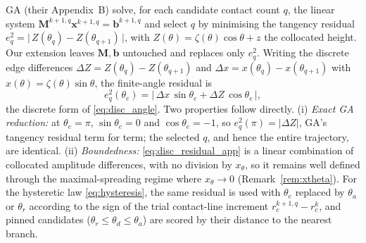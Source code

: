 \documentclass{jfm}
\newcommand{\be}{\begin{equation}}
\newcommand{\ee}{\end{equation}}
\begin{document}
GA (their Appendix~B) solve, for each candidate contact count $q$, the linear system
$\mathbf M^{k+1,q}\mathbf x^{k+1,q}=\mathbf b^{k+1,q}$ and select $q$ by minimising the
tangency residual $e^2_q=\big|\,Z(\theta_q)-Z(\theta_{q+1})\,\big|$, with
$Z(\theta)=\zeta(\theta)\cos\theta+z$ the collocated height. Our extension leaves
$\mathbf M,\mathbf b$ untouched and replaces only $e^2_q$. Writing the discrete edge
differences $\Delta Z=Z(\theta_q)-Z(\theta_{q+1})$ and
$\Delta x=x(\theta_q)-x(\theta_{q+1})$ with $x(\theta)=\zeta(\theta)\sin\theta$, the
finite-angle residual is
\be\label{eq:disc_residual_app}
e^2_q(\theta_e)=\big|\,\Delta x\,\sin\theta_e+\Delta Z\,\cos\theta_e\,\big|,
\ee
the discrete form of \eqref{eq:disc_angle}. Two properties follow directly. (i)
\emph{Exact GA reduction:} at $\theta_e=\pi$, $\sin\theta_e=0$ and $\cos\theta_e=-1$, so
$e^2_q(\pi)=|\Delta Z|$, GA's tangency residual term for term; the selected $q$, and hence
the entire trajectory, are identical. (ii) \emph{Boundedness:} \eqref{eq:disc_residual_app}
is a linear combination of collocated amplitude differences, with no division by $x_\theta$,
so it remains well defined through the maximal-spreading regime where $x_\theta\to0$
(Remark~\ref{rem:xtheta}). For the hysteretic law \eqref{eq:hysteresis}, the same residual
is used with $\theta_e$ replaced by $\theta_a$ or $\theta_r$ according to the sign of the
trial contact-line increment $r_c^{k+1,q}-r_c^{k}$, and pinned candidates
($\theta_r\le\theta_d\le\theta_a$) are scored by their distance to the nearest branch.
\end{document}
